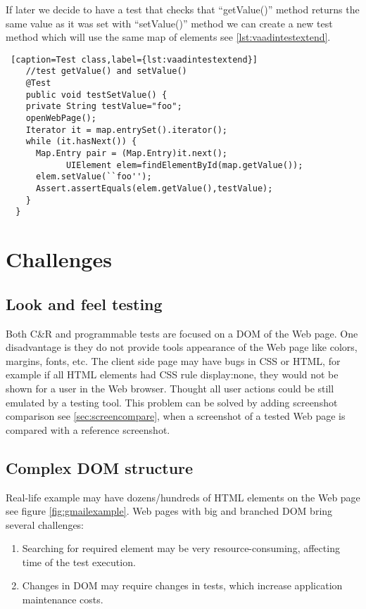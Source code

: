       If later we decide to have a test that checks that ``getValue()'' method
      returns the same value as it was set with ``setValue()'' method we can create
      a new test method which will use the same map of elements see
      \ref{lst:vaadintestextend}.

\lstset{style=a1listing}      
\begin{lstlisting} [caption=Test class,label={lst:vaadintestextend}]
	//test getValue() and setValue()
	@Test
	public void testSetValue() {
    private String testValue="foo";
    openWebPage();
  	Iterator it = map.entrySet().iterator();
    while (it.hasNext()) {
      Map.Entry pair = (Map.Entry)it.next();
			UIElement elem=findElementById(map.getValue());
      elem.setValue(``foo'');  
      Assert.assertEquals(elem.getValue(),testValue);        
    }
  }
\end{lstlisting}

 
\section {Challenges}
	\label {sec:challenges}
	\subsection{Look and feel testing}
	    Both C\&R and programmable tests are focused on a DOM of the Web page.
	    One disadvantage is they do not provide tools appearance of the Web page
	    like colors, margins, fonts, etc. The client side page may have bugs in CSS
	    or HTML, for example if all HTML elements had CSS rule display:none, they
	    would not be shown for a user in the Web browser. Thought all user actions
	    could be still emulated by a testing tool. This problem can be solved by adding screenshot
      comparison see \ref{sec:screencompare}, when a screenshot of a tested Web
      page is compared with a reference screenshot. 
	\subsection{Complex DOM structure}
    Real-life example may have dozens/hundreds of HTML
		elements on the Web page see figure
		\ref{fig:gmailexample}.
		Web pages with big and branched DOM bring several challenges:
		\begin{enumerate}
		  \item Searching for required element may be very resource-consuming,
		  affecting time of the test execution. 
		  \item Changes in DOM may require changes in tests, which increase
		  application maintenance costs.
		\end{enumerate}
		
